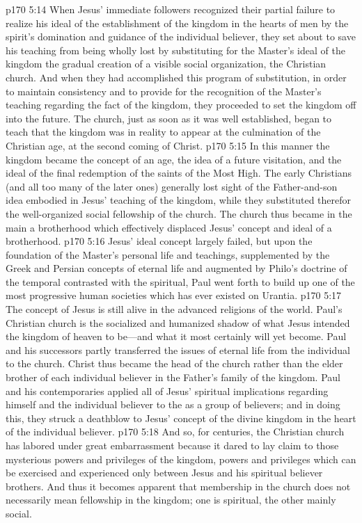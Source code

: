 \vs p170 5:14 When Jesus’ immediate followers recognized their partial failure to realize his ideal of the establishment of the kingdom in the hearts of men by the spirit’s domination and guidance of the individual believer, they set about to save his teaching from being wholly lost by substituting for the Master’s ideal of the kingdom the gradual creation of a visible social organization, the Christian church. And when they had accomplished this program of substitution, in order to maintain consistency and to provide for the recognition of the Master’s teaching regarding the fact of the kingdom, they proceeded to set the kingdom off into the future. The church, just as soon as it was well established, began to teach that the kingdom was in reality to appear at the culmination of the Christian age, at the second coming of Christ.
\vs p170 5:15 In this manner the kingdom became the concept of an age, the idea of a future visitation, and the ideal of the final redemption of the saints of the Most High. The early Christians (and all too many of the later ones) generally lost sight of the Father\hyp{}and\hyp{}son idea embodied in Jesus’ teaching of the kingdom, while they substituted therefor the well\hyp{}organized social fellowship of the church. The church thus became in the main a  brotherhood which effectively displaced Jesus’ concept and ideal of a  brotherhood.
\vs p170 5:16 Jesus’ ideal concept largely failed, but upon the foundation of the Master’s personal life and teachings, supplemented by the Greek and Persian concepts of eternal life and augmented by Philo’s doctrine of the temporal contrasted with the spiritual, Paul went forth to build up one of the most progressive human societies which has ever existed on Urantia.
\vs p170 5:17 The concept of Jesus is still alive in the advanced religions of the world. Paul’s Christian church is the socialized and humanized shadow of what Jesus intended the kingdom of heaven to be---and what it most certainly will yet become. Paul and his successors partly transferred the issues of eternal life from the individual to the church. Christ thus became the head of the church rather than the elder brother of each individual believer in the Father’s family of the kingdom. Paul and his contemporaries applied all of Jesus’ spiritual implications regarding himself and the individual believer to the  as a group of believers; and in doing this, they struck a deathblow to Jesus’ concept of the divine kingdom in the heart of the individual believer.
\vs p170 5:18 And so, for centuries, the Christian church has labored under great embarrassment because it dared to lay claim to those mysterious powers and privileges of the kingdom, powers and privileges which can be exercised and experienced only between Jesus and his spiritual believer brothers. And thus it becomes apparent that membership in the church does not necessarily mean fellowship in the kingdom; one is spiritual, the other mainly social.
